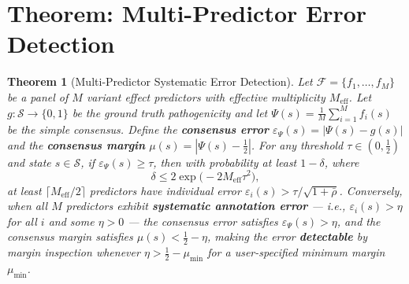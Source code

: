\documentclass[11pt,a4paper]{article}
\newtheorem{theorem}{Theorem}[section]
\theoremstyle{definition}
\newcommand{\calF}{\mathcal{F}}
\newcommand{\calS}{\mathcal{S}}
\newcommand{\consensus}{\Psi}
\begin{document}
\section{Theorem: Multi-Predictor Error Detection}
\label{sec:thm1}
\begin{theorem}[Multi-Predictor Systematic Error Detection]
\label{thm:multi-error}
Let $\calF = \{f_1, \dots, f_M\}$ be a panel of $M$ variant effect predictors with effective multiplicity $M_{\text{eff}}$.
Let $g: \calS \to \{0,1\}$ be the ground truth pathogenicity and let $\consensus(s) = \frac{1}{M}\sum_{i=1}^{M} f_i(s)$ be the simple consensus.
Define the \textbf{consensus error} $\varepsilon_{\consensus}(s) = |\consensus(s) - g(s)|$ and the \textbf{consensus margin} $\mu(s) = |\consensus(s) - \frac{1}{2}|$.
For any threshold $\tau \in (0, \frac{1}{2})$ and state $s \in \calS$, if $\varepsilon_{\consensus}(s) \geq \tau$, then with probability at least $1 - \delta$, where
\begin{equation}
    \delta \leq 2 \exp\!\Big(-2 M_{\text{eff}} \tau^2\Big),
\end{equation}
at least $\lceil M_{\text{eff}}/2 \rceil$ predictors have individual error $\varepsilon_i(s) > \tau / \sqrt{1+\bar{\rho}}$.
Conversely, when all $M$ predictors exhibit \textbf{systematic annotation error} — i.e., $\varepsilon_i(s) > \eta$ for all $i$ and some $\eta > 0$ — the consensus error satisfies $\varepsilon_{\consensus}(s) > \eta$, and the consensus margin satisfies $\mu(s) < \frac{1}{2} - \eta$, making the error \textbf{detectable} by margin inspection whenever $\eta > \frac{1}{2} - \mu_{\min}$ for a user-specified minimum margin $\mu_{\min}$.
\end{theorem}
\end{document}
